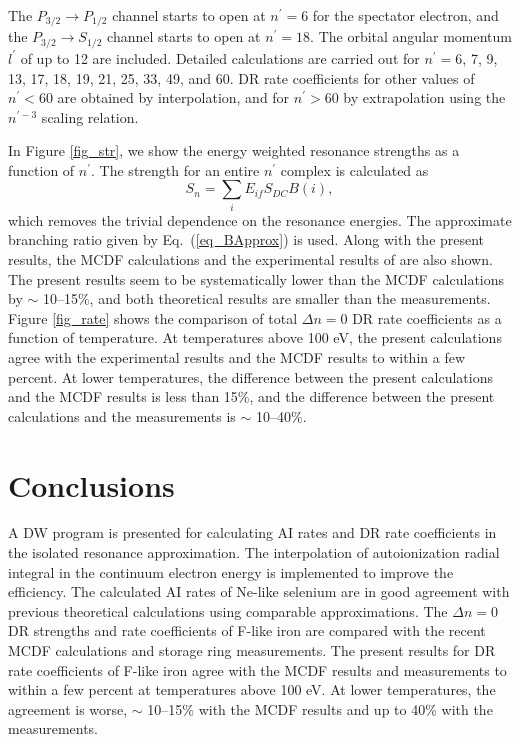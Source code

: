\documentclass[preprint, floatfix, pra, showpacs, showkeys]{revtex4}
\begin{document}
The $P_{3/2}\to P_{1/2}$ channel starts to open at $n^\prime = 6$ for the
spectator electron, and the $P_{3/2}\to S_{1/2}$ channel starts to open at
$n^\prime = 18$. The orbital angular momentum $l^\prime$ of up to 12 are
included. Detailed calculations are carried out for $n^\prime =$6, 7, 9, 13,
17, 18, 19, 21, 25, 33, 49, and 60. DR rate coefficients for other values of
$n^\prime < 60$ are obtained by interpolation, and for $n^\prime > 60$ by
extrapolation using the $n^{\prime-3}$ scaling relation. 

In Figure \ref{fig_str}, we show the energy weighted resonance strengths as a
function of $n^\prime$. The strength for an entire $n^\prime$ complex is
calculated as 
\begin{equation}
S_n = \sum_i E_{if}S_{DC}B(i),
\end{equation}
which removes the trivial dependence on the resonance energies. The approximate
branching ratio given by Eq.~(\ref{eq_BApprox}) is used. 
Along with the present results, the MCDF calculations and the experimental
results of \textcite{savin99} are also shown. The present results seem to be
systematically lower than the MCDF calculations by $\sim$ 10--15\%, and 
both theoretical results are smaller than the measurements. 
Figure \ref{fig_rate} shows the comparison of total $\Delta n = 0$ DR rate
coefficients as a function of temperature. At temperatures above 100 eV, the
present calculations agree with the experimental results and the MCDF results
to within a few percent. At lower temperatures, the difference between the
present calculations and the MCDF results is less than 15\%, and the difference
between the present calculations and the measurements is $\sim$ 10--40\%.

\section{Conclusions}
\label{sec_conclusions}
A DW program is presented for calculating AI rates and DR rate
coefficients in the isolated resonance approximation. The interpolation of
autoionization radial integral in the continuum electron energy is implemented
to improve the efficiency. The calculated AI rates of Ne-like selenium are
in good agreement with previous theoretical calculations using comparable
approximations.  
The $\Delta n = 0$ DR strengths and rate coefficients of F-like iron are
compared with the recent MCDF calculations and storage ring measurements. 
The present results for DR rate coefficients of F-like iron agree with the
MCDF results and measurements to within a few percent at temperatures above
100 eV. At lower temperatures, the agreement is worse, $\sim$ 10--15\% with
the MCDF results and up to 40\% with the measurements.
\end{document}
